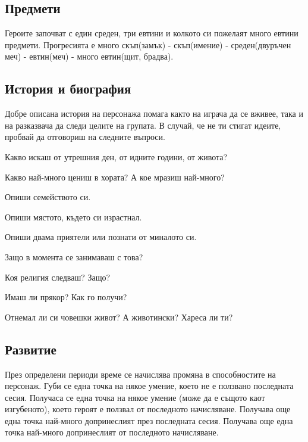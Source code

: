 \subsection{Предмети}
Героите започват с един среден, три евтини и колкото си пожелаят много евтини предмети.
Прогресията е много скъп(замък) - скъп(имение) - среден(двуръчен меч) - евтин(меч) - много евтин(щит, брадва).

\subsection{История и биография}
Добре описана история на персонажа помага както на играча да се вживее, така и на разказвача да следи целите на групата.
В случай, че не ти стигат идеите, пробвай да отговориш на следните въпроси.
\begin{itemize*}
\item{Какво искаш от утрешния ден, от идните години, от живота?}
\item{Какво най-много цениш в хората? А кое мразиш най-много?}
\item{Опиши семейството си.}
\item{Опиши мястото, където си израстнал.}
\item{Опиши двама приятели или познати от миналото си.}
\item{Защо в момента се занимаваш с това?}
\item{Коя религия следваш? Защо?}
\item{Имаш ли прякор? Как го получи?}
\item{Отнемал ли си човешки живот? А животински? Хареса ли ти?}
\end{itemize*}

\subsection{Развитие}
През определени периоди време се начислява промяна в способностите на персонаж.
Губи се една точка на някое умение, което не е ползвано последната сесия.
Получаса се една точка на някое умение (може да е същото каот изгубеното), което героят е ползвал от последното начисляване.
Получава още една точка най-много допринеслият през последната сесия.
Получава още една точка най-много допринеслият от последното начисляване.

